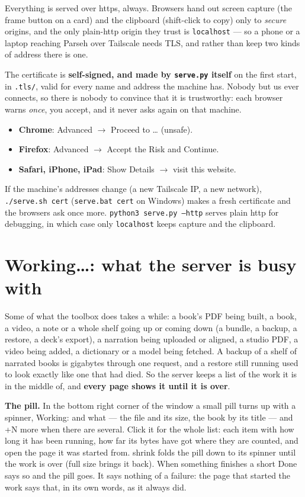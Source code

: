 \documentclass[11pt,oneside]{report}
\newcommand{\file}[1]{\texttt{#1}}
\newcommand{\menu}[1]{\textsf{#1}}
\begin{document}
Everything is served over https, always. Browsers hand out screen capture
(the frame button on a card) and the clipboard (shift-click to copy) only
to \emph{secure} origins, and the only plain-http origin they trust is
\texttt{localhost} --- so a phone or a laptop reaching Parseh over Tailscale
needs TLS, and rather than keep two kinds of address there is one.

The certificate is \textbf{self-signed, and made by \file{serve.py} itself}
on the first start, in \file{.tls/}, valid for every name and address the
machine has. Nobody but us ever connects, so there is nobody to convince
that it is trustworthy: each browser warns \emph{once}, you accept, and it
never asks again on that machine.

\begin{itemize}
\item \textbf{Chrome}: \menu{Advanced} $\rightarrow$ \menu{Proceed to
  \ldots{} (unsafe)}.
\item \textbf{Firefox}: \menu{Advanced} $\rightarrow$ \menu{Accept the Risk
  and Continue}.
\item \textbf{Safari, iPhone, iPad}: \menu{Show Details} $\rightarrow$
  \menu{visit this website}.
\end{itemize}

If the machine's addresses change (a new Tailscale IP, a new network),
\file{./serve.sh cert} (\texttt{serve.bat cert} on Windows) makes a fresh
certificate and the browsers ask once more. \texttt{python3 serve.py --http} serves plain http for debugging, in
which case only \texttt{localhost} keeps capture and the clipboard.

\section{Working\ldots: what the server is busy with}
\label{sec:activity}

Some of what the toolbox does takes a while: a book's PDF being built, a
book, a video, a note or a whole shelf going up or coming down (a bundle, a
backup, a restore, a deck's export), a narration being uploaded or aligned, a
studio PDF, a video being added, a dictionary or a model being fetched. A
backup of a shelf of narrated books is gigabytes through one request, and a
restore still running used to look exactly like one that had died. So the
server keeps a list of the work it is in the middle of, and \textbf{every page
shows it until it is over}.

\textbf{The pill.} In the bottom right corner of the window a small pill
turns up with a spinner, \menu{Working:} and what --- the file and its size,
the book by its title --- and \menu{+N more} when there are several. Click it
for the whole list: each item with how long it has been running, how far its
bytes have got where they are counted, and \menu{open the page} it was
started from. \menu{shrink} folds the pill down to its spinner until the
work is over (\menu{full size} brings it back). When something finishes a
short \menu{Done} says so and the pill goes. It says nothing of a failure:
the page that started the work says that, in its own words, as it always did.
\end{document}
